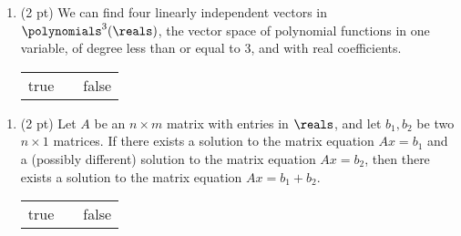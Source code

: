 


\begin{enumerate}[resume,label=(\alph*)]
\item\label{itm : E1Q1c} (2 pt) We can find four linearly independent vectors in $\polynomials^{3}(\reals)$, the vector space of polynomial functions in one variable, of degree less than or equal to $3$, and with real coefficients.
\begin{center}
\begin{tabular}{c c c}
true	&	\hspace{1in}	&	false
\end{tabular}
\end{center}
\end{enumerate}




\begin{enumerate}[resume,label=(\alph*)]
\item\label{itm : E1Q1d} (2 pt) Let $A$ be an $n \times m$ matrix with entries in $\reals$, and let $b_{1},b_{2}$ be two $n \times 1$ matrices. If there exists a solution to the matrix equation $A x = b_{1}$ and a (possibly different) solution to the matrix equation $A x = b_{2}$, then there exists a solution to the matrix equation $A x = b_{1} + b_{2}$.
\begin{center}
\begin{tabular}{c c c}
true	&	\hspace{1in}	&	false
\end{tabular}
\end{center}
\end{enumerate}




